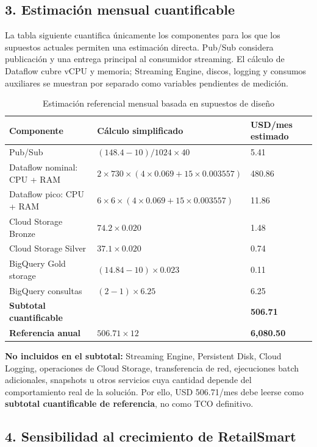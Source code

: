 \documentclass[11pt,a4paper]{article}
\begin{document}
\subsection*{3. Estimación mensual cuantificable}

La tabla siguiente cuantifica únicamente los componentes para los que los supuestos actuales permiten una estimación directa. Pub/Sub considera publicación y una entrega principal al consumidor streaming. El cálculo de Dataflow cubre vCPU y memoria; Streaming Engine, discos, logging y consumos auxiliares se muestran por separado como variables pendientes de medición.

\begin{table}[H]
\caption{Estimación referencial mensual basada en supuestos de diseño}\label{tab:calculadora-costos}
\small
\begin{tabularx}{\linewidth}{@{}P{.25\linewidth}P{.38\linewidth}Y@{}}\toprule
Componente & Cálculo simplificado & USD/mes estimado\\\midrule
Pub/Sub & $(148.4-10)/1024\times40$ & 5.41\\
Dataflow nominal: CPU + RAM & $2\times730\times(4\times0.069+15\times0.003557)$ & 480.86\\
Dataflow pico: CPU + RAM & $6\times6\times(4\times0.069+15\times0.003557)$ & 11.86\\
Cloud Storage Bronze & $74.2\times0.020$ & 1.48\\
Cloud Storage Silver & $37.1\times0.020$ & 0.74\\
BigQuery Gold storage & $(14.84-10)\times0.023$ & 0.11\\
BigQuery consultas & $(2-1)\times6.25$ & 6.25\\\midrule
\textbf{Subtotal cuantificable} & & \textbf{506.71}\\
\textbf{Referencia anual} & $506.71\times12$ & \textbf{6,080.50}\\\bottomrule
\end{tabularx}
\end{table}

\textbf{No incluidos en el subtotal:} Streaming Engine, Persistent Disk, Cloud Logging, operaciones de Cloud Storage, transferencia de red, ejecuciones batch adicionales, snapshots u otros servicios cuya cantidad depende del comportamiento real de la solución. Por ello, USD 506.71/mes debe leerse como \textbf{subtotal cuantificable de referencia}, no como TCO definitivo.

\subsection*{4. Sensibilidad al crecimiento de RetailSmart}
\end{document}
